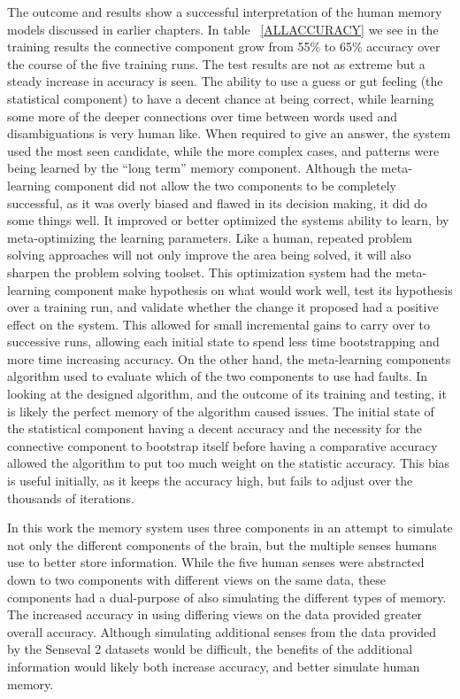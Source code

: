 The outcome and results show a successful interpretation of the human memory models discussed in earlier chapters. In table ~\ref{ALLACCURACY} we see in the training results the connective component grow from 55\% to 65\% accuracy over the course of the five training runs. The test results are not as extreme but a steady increase in accuracy is seen.  The ability to use a guess or gut feeling (the statistical component) to have a decent chance at being correct, while learning some more of the deeper connections over time between words used and disambiguations is very human like.  When required to give an answer, the system used the most seen candidate, while the more complex cases, and patterns were being learned by the ``long term'' memory component.  Although the meta-learning component did not allow the two components to be completely successful, as it was overly biased and flawed in its decision making, it did do some things well. It improved or better optimized the systems ability to learn, by meta-optimizing the learning parameters. Like a human, repeated problem solving approaches will not only improve the area being solved, it will also sharpen the problem solving toolset. This optimization system had the meta-learning component make hypothesis on what would work well, test its hypothesis over a training run, and validate whether the change it proposed had a positive effect on the system. This allowed for small incremental gains to carry over to successive runs, allowing each initial state to spend less time bootstrapping and more time increasing accuracy. On the other hand, the meta-learning components algorithm used to evaluate which of the two components to use had faults.  In looking at the designed algorithm, and the outcome of its training and testing, it is likely the perfect memory of the algorithm caused issues.  The initial state of the statistical component having a decent accuracy and the necessity for the connective component to bootstrap itself before having a comparative accuracy allowed the algorithm to put too much weight on the statistic accuracy.  This bias is useful initially, as it keeps the accuracy high, but fails to adjust over the thousands of iterations.

In this work the memory system uses three components in an attempt to simulate not only the different components of the brain, but the multiple senses humans use to better store information. While the five human senses were abstracted down to two components with different views on the same data, these components had a dual-purpose of also simulating the different types of memory.  The increased accuracy in using differing views on the data provided greater overall accuracy. Although simulating additional senses from the data provided by the Senseval 2 datasets would be difficult, the benefits of the additional information would likely both increase accuracy, and better simulate human memory.

